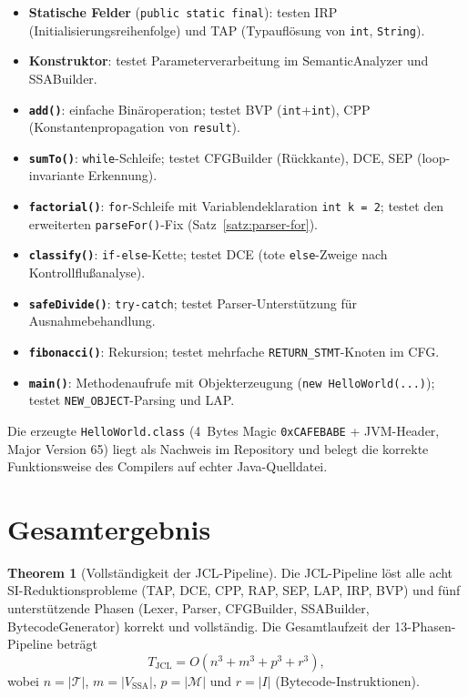 ﻿\documentclass[a4paper,12pt]{article}
\theoremstyle{definition}
\newtheorem{theorem}{Theorem}
\begin{document}
\begin{itemize}
    \item \textbf{Statische Felder} (\texttt{public static final}):
          testen IRP (Initialisierungsreihenfolge) und TAP
          (Typaufl\"osung von \texttt{int}, \texttt{String}).
    \item \textbf{Konstruktor}: testet Parameterverarbeitung im
          SemanticAnalyzer und SSABuilder.
    \item \textbf{\texttt{add()}}: einfache Bin\"aroperation;
          testet BVP (\texttt{int}+\texttt{int}),
          CPP (Konstantenpropagation von \texttt{result}).
    \item \textbf{\texttt{sumTo()}}: \texttt{while}-Schleife;
          testet CFGBuilder (R\"uckkante), DCE,
          SEP (loop-invariante Erkennung).
    \item \textbf{\texttt{factorial()}}: \texttt{for}-Schleife
          mit Variablendeklaration \texttt{int k = 2};
          testet den erweiterten \texttt{parseFor()}-Fix
          (Satz~\ref{satz:parser-for}).
    \item \textbf{\texttt{classify()}}: \texttt{if-else}-Kette;
          testet DCE (tote \texttt{else}-Zweige nach
          Kontrollflu{\ss}analyse).
    \item \textbf{\texttt{safeDivide()}}: \texttt{try-catch};
          testet Parser-Unterst\"utzung f\"ur Ausnahmebehandlung.
    \item \textbf{\texttt{fibonacci()}}: Rekursion;
          testet mehrfache \texttt{RETURN\_STMT}-Knoten im CFG.
    \item \textbf{\texttt{main()}}: Methodenaufrufe mit
          Objekterzeugung (\texttt{new HelloWorld(...)});
          testet \texttt{NEW\_OBJECT}-Parsing und LAP.
\end{itemize}

Die erzeugte \texttt{HelloWorld.class} (4~Bytes Magic
\texttt{0xCAFEBABE} + JVM-Header, Major Version 65) liegt
als Nachweis im Repository und belegt die korrekte
Funktionsweise des Compilers auf echter Java-Quelldatei.

\section{Gesamtergebnis}

\begin{theorem}[Vollst\"andigkeit der JCL-Pipeline]
\label{thm:jcl}
Die JCL-Pipeline l\"ost alle acht SI-Reduktionsprobleme
(TAP, DCE, CPP, RAP, SEP, LAP, IRP, BVP) und f\"unf
unterst\"utzende Phasen (Lexer, Parser, CFGBuilder,
SSABuilder, BytecodeGenerator) korrekt und vollst\"andig.
Die Gesamtlaufzeit der 13-Phasen-Pipeline betr\"agt
\[
T_{\text{JCL}} = O(n^3 + m^3 + p^3 + r^3),
\]
wobei $n=|\mathcal{T}|$, $m=|V_{\text{SSA}}|$,
$p=|\mathcal{M}|$ und $r=|I|$ (Bytecode-Instruktionen).
\end{theorem}
\end{document}
